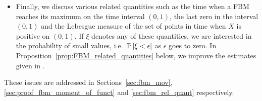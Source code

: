 \documentclass[11pt]{article}
\theoremstyle{plain}
\newtheorem{prop}[thm]{Proposition}
\theoremstyle{definition}
\begin{document}
\begin{itemize}
\begin{prop}
\begin{equation}
   T^{-(1-H)} (\log T)^{-c} \precsim {\mathbb{E}\left[{J_T^k}\right]} \precsim T^{-(1-H)} (\log T)^c, \qquad T \to \infty.
\end{equation}
\end{prop}
Solving the case $k=1$ was actually the key to the computation of the persistence exponent in \cite{molchan:1999a} where it is shown that ${\mathbb{E}\left[{J_T}\right]} \sim C T^{-(1-H)}$ for some constant $C > 0$. Our proof is based on estimates of the persistence probability of FBM in \cite{aurzada:2011}, an estimate on the modulus of continuity of FBM in \cite{scheutzow:2009} and Proposition~\ref{prop:FBM_log_boundary}.
\item Finally, we discuss various related quantities such as the time when a FBM reaches its maximum on the time interval $(0,1)$, the last zero in the interval $(0,1)$ and the Lebesgue measure of the set of points in time when $X$ is positive on $(0,1)$. If $\xi$ denotes any of these quantities, we are interested in the probability of small values, i.e.\ ${{{\bf {\mathbb{P}}}}\left[{\xi < \epsilon}\right]}$ as $\epsilon$ goes to zero. In Proposition~\ref{prop:FBM_related_quantities} below, we improve the estimates given in \cite{molchan:1999a}.
\end{itemize}
These issues are addressed in Sections~\ref{sec:fbm_mov}, \ref{sec:proof_fbm_moment_of_funct} and \ref{sec:fbm_rel_quant} respectively. 
\end{document}
